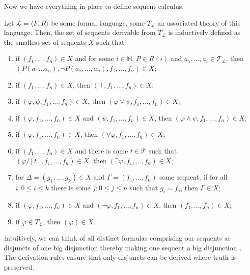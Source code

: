 Now we have everything in place to define sequent calculus.

\begin{definition}\label{def:seq-calc}
    \leanok
    Let $\mathcal{L} = \langle F,R \rangle$ be some formal language, some $T_{\mathcal{L}}$ an associated theory of this language. Then, the set of sequents derivable from $T_{\mathcal{L}}$ is inductively defined as the smallest set of sequents $X$ such that
    \begin{enumerate}
        \item if $(f_1,...,f_n) \in X$ and for some $i \in \mathbb{N}$, $P \in R(i)$ and $a_1,...,a_i \in \mathcal{T}_{\mathcal{L}}$, then \\ $(P(a_1...a_n),\neg P(a_1,...,a_n),f_1,...,f_n) \in X$;
        \item if $(f_1,...,f_n) \in X$, then $(\top,f_1,...,f_n) \in X$;
        \item if $(\varphi,\psi,f_1,...,f_n) \in X$, then $(\varphi \lor \psi,f_1,...,f_n) \in X$;
        \item if $(\varphi,f_1,...,f_n) \in X$ and $(\psi,f_1,...,f_n) \in X$, then $(\varphi \land \psi,f_1,...,f_n) \in X$;
        \item if $(\varphi,f_1,...,f_n) \in X$, then $(\forall \varphi, f_1,...,f_n) \in X$;
        \item if $(f_1,...,f_n) \in X$ and there is some $t \in \mathcal{T}$ such that $(\varphi /[t],f_1,...,f_n) \in X$, then $(\exists \varphi, f_1,...,f_n) \in X$;
        \item for $\Delta = (g_1,...,g_k) \in X$ and $\Gamma = (f_1,...,f_n)$ some sequent, if for all $i: 0 \leq i \leq k$ there is some $j: 0 \leq j \leq n$ such that $g_i = f_j$, then $\Gamma \in X$;
        \item if $(\varphi,f_1,...,f_n) \in X$ and $(\neg \varphi,f_1,...,f_n) \in X$, then $(f_1,...,f_n) \in X$;
        \item if $\varphi \in T_{\mathcal{L}}$, then $(\varphi) \in X$. 
    \end{enumerate}
\end{definition}

Intuitively, we can think of all distinct formulas comprising our sequents as disjuncts of one big disjunction thereby making one sequent a big disjunction \cite{lee2007}. The derivation rules ensure that only disjuncts can be derived where truth is preserved.


